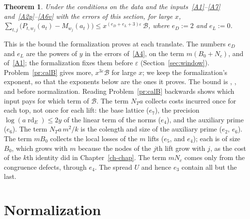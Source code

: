 \documentclass[reqno]{amsart}
\newcounter{chap}
\theoremstyle{definition}
\theoremstyle{plain}
\newtheorem{theorem}{Theorem}[section]
\newcommand{\Bc}{\mathcal{B}}
\newcommand{\rd}{\operatorname{rd}}
\begin{document}
\begin{theorem}\label{thm:M}
Under the conditions on the data and the inputs~\eqref{A1}--\eqref{A7} and~\eqref{A2p}--\eqref{A6v} with the errors of this section, for large \(x\),
\(
  \sum_{t,j}\bigl(P_{t,w_j}(a_t) - M_{w_j}(a_t)\bigr) \le x^{(e_D + e_L + 3)\varepsilon}\,\Bc
\),
where \(e_D := 2\) and \(e_L := 0\).
\end{theorem}

This is the bound the formalization proves at each translate.  The numbers \(e_D\) and \(e_L\) are the powers of \(y\) in the errors of~\eqref{A4}, on the term \(m(B_0 + N_c)\), and of~\eqref{A1}; the formalization fixes them before \(\varepsilon\) (Section~\ref{sec:window}).  Problem~\ref{pr:calB} gives more, \(x^{3\varepsilon}\Bc\) for large \(x\); we keep the formalization's exponent, so that the exponents below are the ones it proves.  The bound is \cite[(4.11)]{Zh}, \cite[Thm.~A]{Adr}, and \cite[\S I.5, (M)]{Rub} before normalization.  Reading Problem~\ref{pr:calB} backwards shows which input pays for which term of \(\Bc\).  The term \(N_Ta\) collects costs incurred once for each top, not once for each lift: the base lattice (\(e_7\)), the precision \(\log(a\rd_E) \le 2y\) of the linear term of the norms (\(e_4\)), and the auxiliary prime (\(e_6\)).  The term \(N_Ta\,m^2/k\) is the colength and size of the auxiliary prime (\(e_2\), \(e_6\)).  The term \(mB_0\) collects the local losses of the \(m\) lifts (\(e_5\), and \(e_4\)); each is of size \(B_0\), which grows with \(m\) because the nodes of the \(j\)th lift grow with \(j\), as the cost of the \(k\)th identity did in Chapter~\ref{ch-chap}.  The term \(mN_c\) comes only from the congruence defects, through \(e_4\).  The spread \(U\) and hence \(e_3\) contain all but the last.

\section{Normalization}\label{sec:norm}
\end{document}
